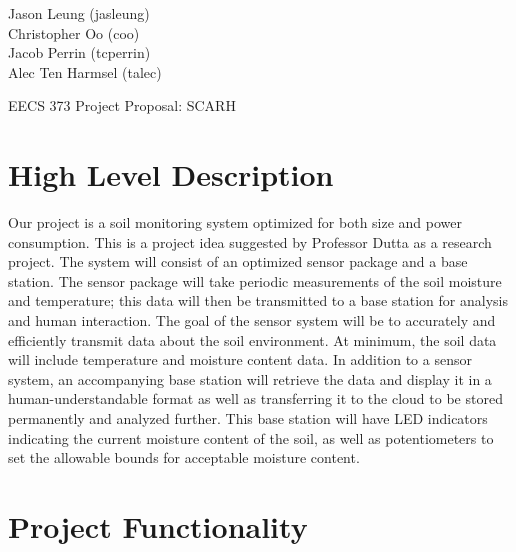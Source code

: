 \documentclass{article}
\begin{document}
\begin{right}
    Jason Leung (jasleung)\\
    Christopher Oo (coo)\\
    Jacob Perrin (tcperrin)\\
    Alec Ten Harmsel (talec)
\end{right}

\begin{center}
    {\Huge
        EECS 373 Project Proposal: SCARH
    }
\end{center}

\section{High Level Description}
Our project is a soil monitoring system optimized for both size and power
consumption.  This is a project idea suggested by Professor Dutta as a research
project. The system will consist of an optimized sensor package and a base
station. The sensor package will take periodic measurements of the soil
moisture and temperature; this data will then be transmitted to a base station
for analysis and human interaction. The goal of the sensor system will be to
accurately and efficiently transmit data about the soil environment. At
minimum, the soil data will include temperature and moisture content data. In
addition to a sensor system, an accompanying base station will retrieve the
data and display it in a human-understandable format as well as transferring it
to the cloud to be stored permanently and analyzed further. This base station
will have LED indicators indicating the current moisture content of the soil,
as well as potentiometers to set the allowable bounds for acceptable moisture
content.

\section{Project Functionality}
\end{document}
